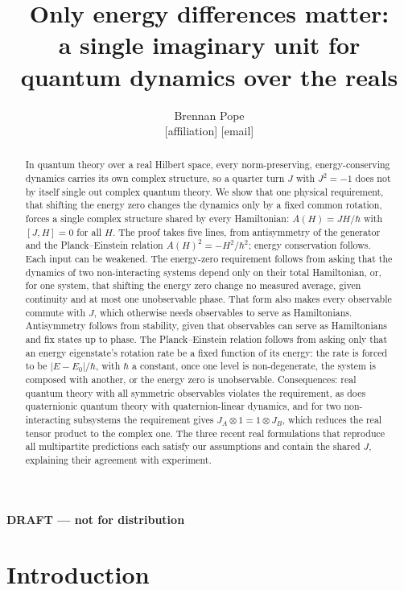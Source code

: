 \documentclass[11pt]{article}
\title{Only energy differences matter:\\ a single imaginary unit for quantum dynamics over the reals}
\author{Brennan Pope\\ \small [affiliation] \quad \small [email]}
\date{}
\theoremstyle{remark}
\begin{document}
\maketitle
\begin{center}\textbf{DRAFT --- not for distribution}\end{center}

\begin{abstract}
In quantum theory over a real Hilbert space, every norm-preserving, energy-conserving dynamics carries its own complex structure, so a quarter turn $J$ with $J^2=-1$ does not by itself single out complex quantum theory. We show that one physical requirement, that shifting the energy zero changes the dynamics only by a fixed common rotation, forces a single complex structure shared by every Hamiltonian: $A(H)=JH/\hbar$ with $[J,H]=0$ for all $H$. The proof takes five lines, from antisymmetry of the generator and the Planck--Einstein relation $A(H)^2=-H^2/\hbar^2$; energy conservation follows. Each input can be weakened. The energy-zero requirement follows from asking that the dynamics of two non-interacting systems depend only on their total Hamiltonian, or, for one system, that shifting the energy zero change no measured average, given continuity and at most one unobservable phase. That form also makes every observable commute with $J$, which otherwise needs observables to serve as Hamiltonians. Antisymmetry follows from stability, given that observables can serve as Hamiltonians and fix states up to phase. The Planck--Einstein relation follows from asking only that an energy eigenstate's rotation rate be a fixed function of its energy: the rate is forced to be $|E-E_0|/\hbar$, with $\hbar$ a constant, once one level is non-degenerate, the system is composed with another, or the energy zero is unobservable. Consequences: real quantum theory with all symmetric observables violates the requirement, as does quaternionic quantum theory with quaternion-linear dynamics, and for two non-interacting subsystems the requirement gives $J_A\otimes 1=1\otimes J_B$, which reduces the real tensor product to the complex one. The three recent real formulations that reproduce all multipartite predictions each satisfy our assumptions and contain the shared $J$, explaining their agreement with experiment.
\end{abstract}

\section{Introduction}
\end{document}
